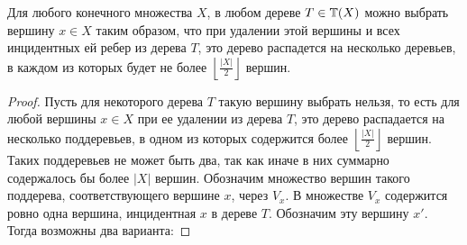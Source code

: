 \vspace{1cm}
\begin{lemma}\label{lemma:tree_subdivision}
Для любого конечного множества $X$, в любом дереве $T \in \mathbb{T}(X)$ можно выбрать вершину $x \in X$ таким образом, что при удалении этой вершины и всех инцидентных ей ребер из дерева $T$, это дерево распадется на несколько деревьев, в каждом из которых будет не более $\left\lfloor\frac{|X|}{2}\right\rfloor$ вершин.
\end{lemma}
\begin{proof}
Пусть для некоторого дерева $T$ такую вершину выбрать нельзя, то есть для любой вершины $x \in X$ при ее удалении из дерева $T$, это дерево распадается на несколько поддеревьев, в одном из которых содержится более $\left\lfloor\frac{|X|}{2}\right\rfloor$ вершин. Таких поддеревьев не может быть два, так как иначе в них суммарно содержалось бы более $|X|$ вершин. Обозначим множество вершин такого поддерева, соответствующего вершине $x$, через $V_x$. В множестве $V_x$ содержится ровно одна вершина, инцидентная $x$ в дереве $T$. Обозначим эту вершину $x'$. Тогда возможны два варианта:


\end{proof}
